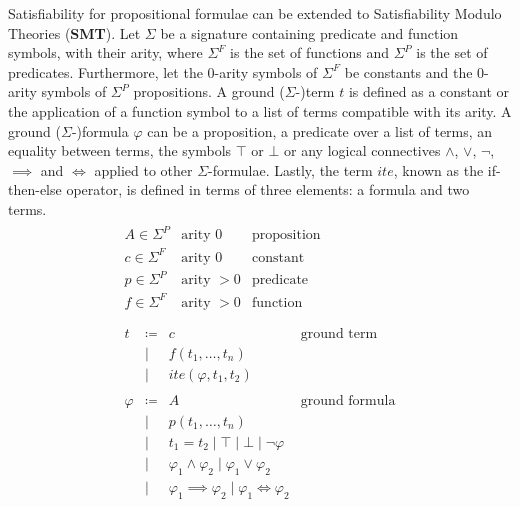 \documentclass[runningheads]{llncs}
\begin{document}
Satisfiability for propositional formulae can be extended to Satisfiability Modulo Theories (\textbf{SMT}).
Let $\Sigma$ be a signature containing predicate and function symbols, with their arity, where $\Sigma^F$ is the set of functions and $\Sigma^P$ is the set of predicates.
Furthermore, let the 0-arity symbols of $\Sigma^F$ be constants and the 0-arity symbols of $\Sigma^P$ propositions.
A ground ($\Sigma$-)term $t$ is defined as a constant or the application of a function symbol to a list of terms compatible with its arity.
A ground ($\Sigma$-)formula $\varphi$ can be a proposition, a predicate over a list of terms, an equality between terms, the symbols $\top$ or $\bot$ or any logical connectives $\land$, $\lor$, $\neg$, $\implies$ and $\iff$ applied to other $\Sigma$-formulae.
Lastly, the term $ite$, known as the if-then-else operator, is defined in terms of three elements: a formula and two terms.
\begin{equation}
    \label{eq:smt-notations}
    \begin{gathered}
        \begin{array}{lll}
            A \in \Sigma^P & \text{arity } 0   & \text{proposition} \\
            c \in \Sigma^F & \text{arity } 0   & \text{constant}    \\
            p \in \Sigma^P & \text{arity } > 0 & \text{predicate}   \\
            f \in \Sigma^F & \text{arity } > 0 & \text{function}    \\
        \end{array}
        \\
        \begin{array}{lrll}
            t       & \coloneqq & c                                                          & \text{ground term}    \\
                    & \mid      & f(t_1, \ldots, t_n)                                                                \\
                    & \mid      & ite(\varphi, t_1, t_2)                                                             \\
            \\
            \varphi & \coloneqq & A                                                          & \text{ground formula} \\
                    & \mid      & p(t_1, \ldots, t_n)                                                                \\
                    & \mid      & t_1 = t_2 \mid \top \mid \bot \mid \neg\varphi                                     \\
                    & \mid      & \varphi_1 \land \varphi_2 \mid \varphi_1 \lor \varphi_2                            \\
                    & \mid      & \varphi_1 \implies \varphi_2 \mid \varphi_1 \iff \varphi_2                         \\
        \end{array}
    \end{gathered}
\end{equation}
\end{document}
